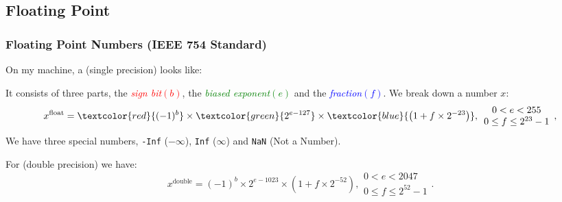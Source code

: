 \documentclass[smaller,table]{beamer} %
\begin{document}
\subsection{Floating Point}
\begin{frame}
\frametitle{Floating Point Numbers (IEEE 754 Standard)}
On my machine, a  (single precision) looks like:\\
\begin{center}
\end{center}
It consists of three parts, the \textcolor{red}{\emph{sign bit}$(b)$}, the \textcolor{green}{\emph{biased exponent}$(e)$} and the \textcolor{blue}{\emph{fraction}$(f)$}.
We break down a number $x$:
$$x^{\textrm{float}} = \textcolor{red}{(-1)^b} \times 
\textcolor{green}{2^{e-127}} \times \textcolor{blue}{\left(1+f\times2^{-23}\right)},
\begin{array}{c}
0 < e < 255\\0 \leq f \leq 2^{23}-1
\end{array},$$
We have three special numbers, {\tt -Inf} ($-\infty$), {\tt Inf} ($\infty$) and {\tt NaN} (Not a Number).

For  (double precision) we have:
$$x^{\textrm{double}} = (-1)^b\times 2^{e-1023}\times\left(1+f\times2^{-52}\right),
\begin{array}{c}
0 < e < 2047\\0 \leq f \leq 2^{52}-1
\end{array}.$$
\end{frame}
\end{document}

